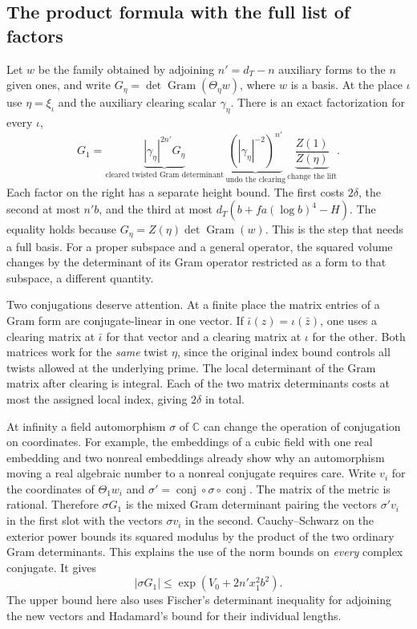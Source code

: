 \documentclass[11pt,letterpaper]{article}
\begin{document}
\subsection{The product formula with the full list of factors}
\label{sec:local-to-global-volume}
Let $w$ be the family obtained by adjoining $n'=d_T-n$ auxiliary forms to the $n$ given ones, and write $G_\eta=\det\operatorname{Gram}(\Theta_\eta w)$, where $w$ is a basis. At the place $\iota$ use $\eta=\xi_\iota$ and the auxiliary clearing scalar $\gamma_\eta$. There is an exact factorization for every $\iota$,
\[
 G_1=\underbrace{|\gamma_\eta|^{2n'}G_\eta}_{\text{cleared twisted Gram determinant}}\,
      \underbrace{(|\gamma_\eta|^{-2})^{n'}}_{\text{undo the clearing}}\,
      \underbrace{\frac{Z(1)}{Z(\eta)}}_{\text{change the lift}} .
\]
Each factor on the right has a separate height bound. The first costs $2\delta$, the second at most $n'b$, and the third at most $d_T(b+fa(\log b)^4-H)$. The equality holds because $G_\eta=Z(\eta)\det\operatorname{Gram}(w)$. This is the step that needs a full basis. For a proper subspace and a general operator, the squared volume changes by the determinant of its Gram operator restricted as a form to that subspace, a different quantity.

Two conjugations deserve attention. At a finite place the matrix entries of a Gram form are conjugate-linear in one vector. If $\bar\iota(z)=\iota(\bar z)$, one uses a clearing matrix at $\bar\iota$ for that vector and a clearing matrix at $\iota$ for the other. Both matrices work for the \emph{same} twist $\eta$, since the original index bound controls all twists allowed at the underlying prime. The local determinant of the Gram matrix after clearing is integral. Each of the two matrix determinants costs at most the assigned local index, giving $2\delta$ in total.

At infinity a field automorphism $\sigma$ of $\mathbb C$ can change the operation of conjugation on coordinates. For example, the embeddings of a cubic field with one real embedding and two nonreal embeddings already show why an automorphism moving a real algebraic number to a nonreal conjugate requires care. Write $v_i$ for the coordinates of $\Theta_1 w_i$ and $\sigma'=\operatorname{conj}\circ\sigma\circ\operatorname{conj}$. The matrix of the metric is rational. Therefore $\sigma G_1$ is the mixed Gram determinant pairing the vectors $\sigma' v_i$ in the first slot with the vectors $\sigma v_i$ in the second. Cauchy--Schwarz on the exterior power bounds its squared modulus by the product of the two ordinary Gram determinants. This explains the use of the norm bounds on \emph{every} complex conjugate. It gives
\[
                |\sigma G_1|\le \exp(V_0+2n'x_1^2 b^2).
\]
The upper bound here also uses Fischer's determinant inequality for adjoining the new vectors and Hadamard's bound for their individual lengths.
\end{document}
